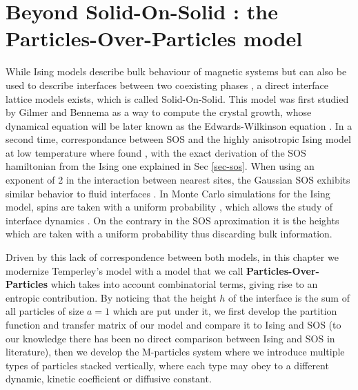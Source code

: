 \chapter{Beyond Solid-On-Solid : the Particles-Over-Particles model}
\label{chap-pop}

While Ising models describe bulk behaviour of magnetic systems \cite{niss_history_2005,niss_history_2009} but can also be used to describe interfaces between two coexisting phases \cite{abraham_interface_1976}, a direct interface lattice models exists, which is called Solid-On-Solid. This model was first studied by Gilmer and Bennema \cite{gilmer_computer_1972,gilmer_simulation_1972} as a way to compute the crystal growth, whose dynamical equation will be later known as the Edwards-Wilkinson equation \cite{edwards_surface_1982,halpin-healy_kinetic_1995} . In a second time, correspondance between SOS and the highly anisotropic Ising model at low temperature where found \cite{swendsen_roughening_1977,guyer_sine-gordon_1979}, with the exact derivation of the SOS hamiltonian from the Ising one explained in Sec \ref{sec-sos}. When using an exponent of 2 in the interaction between nearest sites, the Gaussian SOS exhibits similar behavior to fluid interfaces \cite{h_muller-krumbhaar_kinetic_1976,baillie_solid_1993}.
In Monte Carlo simulations for the Ising model, spins are taken with a uniform probability \cite{metropolis_monte_1949,newman_monte_1999}, which allows the study of interface dynamics \cite{schmittmann_driven_1998,muller_profile_2005,smith_interfaces_2008-1,smith_lateral_2010}. On the contrary in the SOS aproximation it is the heights which are taken with a uniform probability \cite{wilby_scaling_1992,siegert_scaling_1993} thus discarding bulk information. 

Driven by this lack of correspondence between both models, in this chapter we modernize Temperley's model \cite{temperley_statistical_1952} with a model that we call {\bf Particles-Over-Particles} which takes into account combinatorial terms, giving rise to an entropic contribution.
By noticing that the height $h$ of the interface is the sum of all particles of size $a=1$ which are put under it, we first develop the partition function and transfer matrix of our model and compare it to Ising and SOS (to our knowledge there has been no direct comparison between Ising and SOS in literature), then we develop the M-particles system where we introduce multiple types of particles stacked vertically, where each type may obey to a different dynamic, kinetic coefficient or diffusive constant.

